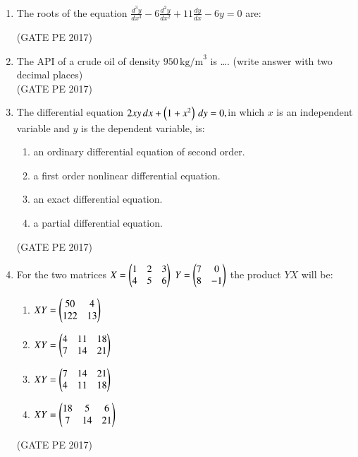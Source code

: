 \documentclass[journal,12pt,onecolumn]{IEEEtran}
\theoremstyle{remark}
\begin{document}
\begin{enumerate}
\item The roots of the equation $ \frac{d^3 y}{dx^3} - 6 \frac{d^2 y}{dx^2} + 11 \frac{dy}{dx} - 6y = 0$ are:
\begin{enumerate}
\end{enumerate}
\hfill{(GATE PE 2017)}

\item The API of a crude oil of density $950\, \text {kg/m}^3$ is \dots. (write answer with two decimal places)\\

\hfill{(GATE PE 2017)}

\item The differential equation $2xy \, dx + \left(1 + x^2\right) \, dy = 0,$in which $x$ is an independent variable and $y$ is the dependent variable, is:
\begin{enumerate}
\item an ordinary differential equation of second order.
\item a first order nonlinear differential equation.
\item an exact differential equation.
\item a partial differential equation.
\end{enumerate}
\hfill{(GATE PE 2017)}

\item For the two matrices $X=
\begin{pmatrix}
1 & 2 & 3\\
4 & 5 & 6
\end{pmatrix}$ $Y=
\begin{pmatrix}
7 & 0\\
8 & -1
\end{pmatrix}$ the product $YX$ will be:
\begin{enumerate}
\item $XY = \begin{pmatrix} 
50 & 4 \\ 
122 & 13 
\end{pmatrix}$
\item $XY = \begin{pmatrix} 
4 & 11 & 18 \\ 
7 & 14 & 21 
\end{pmatrix}$
\item $XY = \begin{pmatrix} 
7 & 14 & 21 \\ 
4 & 11 & 18 
\end{pmatrix}$
\item $XY =\begin{pmatrix} 
18 & 5 & 6 \\ 
7 & 14 & 21 
\end{pmatrix}$
\end{enumerate}
\hfill{(GATE PE 2017)}


\end{enumerate}
\end{document}

